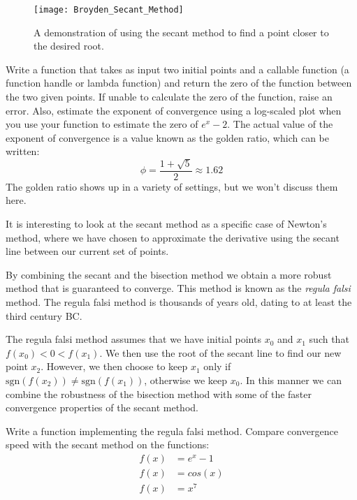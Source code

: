 \begin{figure}
\begin{center}
\texttt{[image: Broyden\_Secant\_Method]}
\caption{A demonstration of using the secant method to find a point closer to the desired root.}
\label{Fig:Secant}
\end{center}
\end{figure}	

\begin{problem}
Write a function that takes as input two initial points and a callable function (a function handle or lambda function) and return the zero of the function between the two given points.  If unable to calculate the zero of the function, raise an error.  Also, estimate the exponent of convergence using a log-scaled plot when you use your function to estimate the zero of $e^x-2$. The actual value of the exponent of convergence is a value known as the golden ratio, which can be written:
\[
\phi = \frac{1 + \sqrt{5}}{2} \approx 1.62
\]
The golden ratio shows up in a variety of settings, but we won't discuss them here.
\end{problem}

It is interesting to look at the secant method as a specific case of Newton's method, where we have chosen to approximate the derivative using the secant line between our current set of points.

By combining the secant and the bisection method we obtain a more robust method that is guaranteed to converge. This method is known as the \emph{regula falsi} method. The regula falsi method is thousands of years old, dating to at least the third century BC.

The regula falsi method assumes that we have initial points $x_0$ and $x_1$ such that $f(x_0) < 0 < f(x_1)$. We then use the root of the secant line to find our new point $x_2$. However, we then choose to keep $x_1$ only if $\mbox{sgn}(f(x_2)) \neq \mbox{sgn}(f(x_1))$, otherwise we keep $x_0$. In this manner we can combine the robustness of the bisection method with some of the faster convergence properties of the secant method.

\begin{problem}
Write a function implementing the regula falsi method. Compare convergence speed with the secant method on the functions:
\begin{align*}
f(x) &= e^x-1\\
f(x) &= cos(x)\\
f(x) &= x^7\\
\end{align*}
\end{problem}

